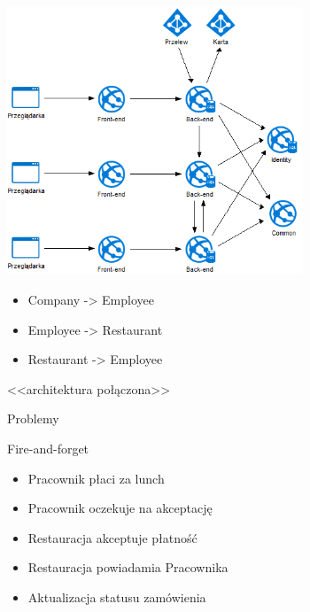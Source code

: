 \documentclass{beamer}
\begin{document}
\begin{frame}{}
	\begin{center}
		\includegraphics[height=8cm]{architektura2.png}
	\end{center}
\end{frame}

\begin{frame}{}
	\begin{huge}
		\begin{itemize}[<+->]
			\item Company -> Employee
			\item Employee -> Restaurant
			\item Restaurant -> Employee
		\end{itemize}
	\end{huge}
\end{frame}

\begin{frame}{}
	\begin{center}
		\Huge{<<architektura połączona>>}
	\end{center}
\end{frame}

\begin{frame}{}
	\begin{center}
		\Huge{Problemy}
	\end{center}
\end{frame}

\begin{frame}{}
	\begin{center}
		\Huge{Fire-and-forget}
	\end{center}
\end{frame}

\begin{frame}{}
	\begin{Large}
		\begin{itemize}[<+->]
			\item Pracownik płaci za lunch
			\item Pracownik oczekuje na akceptację
			\item Restauracja akceptuje płatność
			\item Restauracja powiadamia Pracownika
			\item Aktualizacja statusu zamówienia
		\end{itemize}
	\end{Large}
\end{frame}
\end{document}

